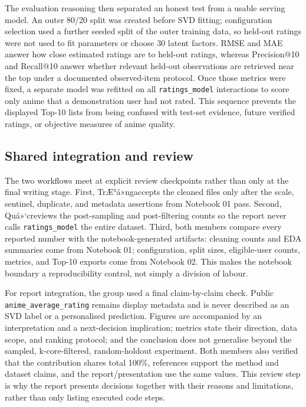 \documentclass[12pt,a4paper]{article}
\newcommand{\memberone}{Mai Nam Quá»‘c -- 29211145181}
\newcommand{\membertwo}{TrÆ°Æ¡ng Nháº­t TrÆ°á»ng -- 29211164915}
\renewcommand{\memberone}{Quá»‘c}
\renewcommand{\membertwo}{TrÆ°á»ng}
\begin{document}
The evaluation reasoning then separated an honest test from a usable serving model. An outer 80/20 split was created before SVD fitting; configuration selection used a further seeded split of the outer training data, so held-out ratings were not used to fit parameters or choose 30 latent factors. RMSE and MAE answer how close estimated ratings are to held-out ratings, whereas Precision@10 and Recall@10 answer whether relevant held-out observations are retrieved near the top under a documented observed-item protocol. Once those metrics were fixed, a separate model was refitted on all \texttt{ratings\_model} interactions to score only anime that a demonstration user had not rated. This sequence prevents the displayed Top-10 lists from being confused with test-set evidence, future verified ratings, or objective measures of anime quality.

\subsection{Shared integration and review}
The two workflows meet at explicit review checkpoints rather than only at the final writing stage. First, \membertwo accepts the cleaned files only after the scale, sentinel, duplicate, and metadata assertions from Notebook 01 pass. Second, \memberone reviews the post-sampling and post-filtering counts so the report never calls \texttt{ratings\_model} the entire dataset. Third, both members compare every reported number with the notebook-generated artifacts: cleaning counts and EDA summaries come from Notebook 01; configuration, split sizes, eligible-user counts, metrics, and Top-10 exports come from Notebook 02. This makes the notebook boundary a reproducibility control, not simply a division of labour.

For report integration, the group used a final claim-by-claim check. Public \texttt{anime\_average\_rating} remains display metadata and is never described as an SVD label or a personalised prediction. Figures are accompanied by an interpretation and a next-decision implication; metrics state their direction, data scope, and ranking protocol; and the conclusion does not generalise beyond the sampled, k-core-filtered, random-holdout experiment. Both members also verified that the contribution shares total 100\%, references support the method and dataset claims, and the report/presentation use the same values. This review step is why the report presents decisions together with their reasons and limitations, rather than only listing executed code steps.
\end{document}
